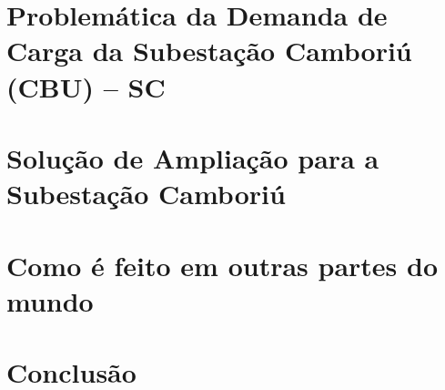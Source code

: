 \documentclass[a5paper]{ufsc-thesis}
\begin{document}
\chapter{Problemática da Demanda de Carga da Subestação Camboriú (CBU) -- SC}
\label{chap:demCarga}
\lipsum


\chapter{Solução de Ampliação para a Subestação Camboriú}
\label{chap:solAmp}
\lipsum


\chapter{Como é feito em outras partes do mundo}
\label{chap:asbuiltAbroad}
\lipsum


\chapter*[Conclusão]{Conclusão}
\lipsum



\end{document}
